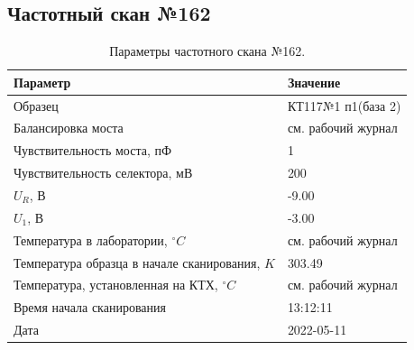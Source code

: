 \subsection{Частотный скан №162}
\begin{table}[!ht]
    \centering
    \caption{Параметры частотного скана №162.}
    \begin{tabular}{|l|l|}
        \hline
        Параметр                                       & Значение                  \\ \hline
        Образец                                        & КТ117№1 п1(база 2)        \\ \hline
        Балансировка моста                             & см. рабочий журнал        \\ \hline
        Чувствительность моста, пФ                     & 1                         \\ \hline
        Чувствительность селектора, мВ                 & 200                       \\ \hline
        $U_R$, В                                       & -9.00                     \\ \hline
        $U_1$, В                                       & -3.00                     \\ \hline
        Температура в лаборатории, $^\circ C$          & см. рабочий журнал        \\ \hline
        Температура образца в начале сканирования, $K$ & 303.49                    \\ \hline
        Температура, установленная на КТХ, $^\circ C$  & см. рабочий журнал        \\ \hline
        Время начала сканирования                      & 13:12:11                  \\ \hline
        Дата                                           & 2022-05-11                \\ \hline
    \end{tabular}
    \label{table:frequency_scan_162}
\end{table}

